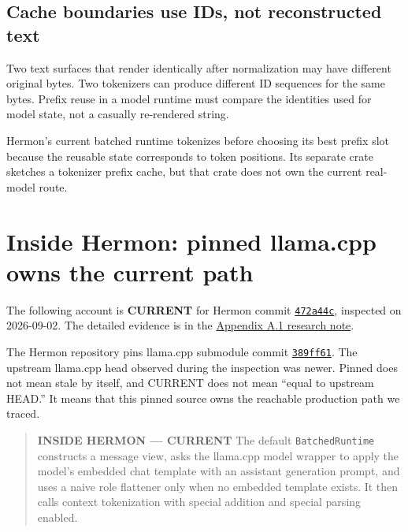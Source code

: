 \subsection{Cache boundaries use IDs, not reconstructed
text}\label{cache-boundaries-use-ids-not-reconstructed-text}

Two text surfaces that render identically after normalization may have
different original bytes. Two tokenizers can produce different ID
sequences for the same bytes. Prefix reuse in a model runtime must
compare the identities used for model state, not a casually re-rendered
string.

Hermon's current batched runtime tokenizes before choosing its best
prefix slot because the reusable state corresponds to token positions.
Its separate \texttt{} crate sketches a
tokenizer prefix cache, but that crate does not own the current
real-model route.

\section{Inside Hermon: pinned llama.cpp owns the current
path}\label{inside-hermon-pinned-llama.cpp-owns-the-current-path}

The following account is \textbf{CURRENT} for Hermon commit
\href{https://github.com/hermonai/hermon/commit/472a44cdb511b2dae6c9569e59543db8f8350b25}{\texttt{472a44c}},
inspected on 2026-09-02. The detailed evidence is in the
\href{https://github.com/hermonai/inside-the-llm-engine/blob/astra-visual-rewrite/research/part-01/chapter-02-from-text-to-tokens.md}{Appendix A.1 research note}.

The Hermon repository pins llama.cpp submodule commit
\href{https://github.com/ggml-org/llama.cpp/commit/389ff61d77b5c71cec0cf92fe4e5d01ace80b797}{\texttt{389ff61}}.
The upstream llama.cpp head observed during the inspection was newer.
Pinned does not mean stale by itself, and CURRENT does not mean ``equal
to upstream HEAD.'' It means that this pinned source owns the reachable
production path we traced.

\begin{quote}
\textbf{INSIDE HERMON --- CURRENT} The default \texttt{BatchedRuntime}
constructs a message view, asks the llama.cpp model wrapper to apply the
model's embedded chat template with an assistant generation prompt, and
uses a naive role flattener only when no embedded template exists. It
then calls context tokenization with special addition and special
parsing enabled.
\end{quote}

